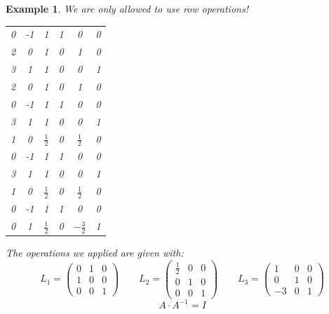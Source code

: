\documentclass[a4paper,landscape,twocolumn]{article}
\newtheorem{ex}{Example}
\begin{document}
\begin{ex}
  \label{beispiel-6.37}
  We are only allowed to use row operations!
  \begin{center}
    \begin{tabular}{ccc|ccc}
      0 & -1 & 1 & 1 & 0 & 0 \\
      2 &  0 & 1 & 0 & 1 & 0 \\
      3 &  1 & 1 & 0 & 0 & 1 \\
    \hline
      2 &  0 & 1 &  0 & 1 & 0 \\
      0 & -1 & 1 &  1 & 0 & 0 \\
      3 &  1 & 1 &  0 & 0 & 1 \\
    \hline
      1 &  0 & $\frac12$ & 0 & $\frac12$ & 0 \\
      0 & -1 & 1 & 1 & 0 & 0 \\
      3 & 1 & 1 & 0 & 0 & 1 \\
    \hline
      1 & 0 & $\frac12$ & 0 & $\frac12$ & 0 \\
      0 & -1 & 1 & 1 & 0 & 0 \\
      0 & 1 & $\frac12$ & 0 & $-\frac32$ & 1
    \end{tabular}
  \end{center}
  The operations we applied are given with:
  \[
    L_1 = \begin{pmatrix}
      0 & 1 & 0 \\
      1 & 0 & 0 \\
      0 & 0 & 1
    \end{pmatrix}
    \qquad
    L_2 = \begin{pmatrix}
      \frac12 & 0 & 0 \\
            0 & 1 & 0 \\
            0 & 0 & 1
    \end{pmatrix}
    \qquad
    L_3 = \begin{pmatrix}
       1 & 0 & 0 \\
       0 & 1 & 0 \\
      -3 & 0 & 1
    \end{pmatrix}
  \]
  \[ A \cdot A^{-1} = I \]


\end{ex}
\end{document}
